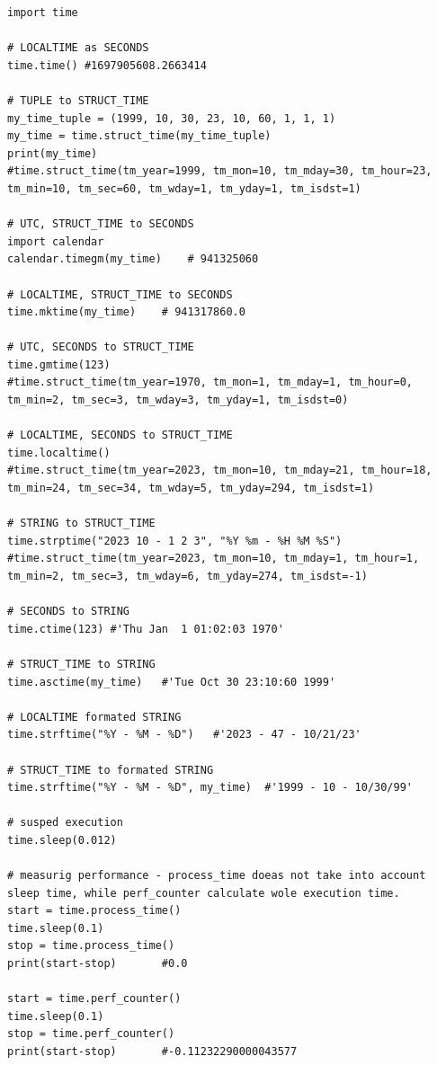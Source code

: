 \documentclass{article}
\begin{document}
\begin{lstlisting}[style=pystyle] 
import time

# LOCALTIME as SECONDS
time.time()	#1697905608.2663414

# TUPLE to STRUCT_TIME
my_time_tuple = (1999, 10, 30, 23, 10, 60, 1, 1, 1)
my_time = time.struct_time(my_time_tuple)
print(my_time)
#time.struct_time(tm_year=1999, tm_mon=10, tm_mday=30, tm_hour=23, tm_min=10, tm_sec=60, tm_wday=1, tm_yday=1, tm_isdst=1)

# UTC, STRUCT_TIME to SECONDS
import calendar
calendar.timegm(my_time)	# 941325060

# LOCALTIME, STRUCT_TIME to SECONDS
time.mktime(my_time)	# 941317860.0

# UTC, SECONDS to STRUCT_TIME
time.gmtime(123)
#time.struct_time(tm_year=1970, tm_mon=1, tm_mday=1, tm_hour=0, tm_min=2, tm_sec=3, tm_wday=3, tm_yday=1, tm_isdst=0)

# LOCALTIME, SECONDS to STRUCT_TIME
time.localtime()
#time.struct_time(tm_year=2023, tm_mon=10, tm_mday=21, tm_hour=18, tm_min=24, tm_sec=34, tm_wday=5, tm_yday=294, tm_isdst=1)

# STRING to STRUCT_TIME
time.strptime("2023 10 - 1 2 3", "%Y %m - %H %M %S")
#time.struct_time(tm_year=2023, tm_mon=10, tm_mday=1, tm_hour=1, tm_min=2, tm_sec=3, tm_wday=6, tm_yday=274, tm_isdst=-1)

# SECONDS to STRING
time.ctime(123)	#'Thu Jan  1 01:02:03 1970'

# STRUCT_TIME to STRING
time.asctime(my_time)	#'Tue Oct 30 23:10:60 1999'

# LOCALTIME formated STRING
time.strftime("%Y - %M - %D")	#'2023 - 47 - 10/21/23'

# STRUCT_TIME to formated STRING
time.strftime("%Y - %M - %D", my_time)	#'1999 - 10 - 10/30/99'

# susped execution
time.sleep(0.012)

# measurig performance - process_time doeas not take into account sleep time, while perf_counter calculate wole execution time.
start = time.process_time() 
time.sleep(0.1)
stop = time.process_time()
print(start-stop)		#0.0

start = time.perf_counter() 
time.sleep(0.1)
stop = time.perf_counter()
print(start-stop)		#-0.11232290000043577

\end{lstlisting}
\end{document}

